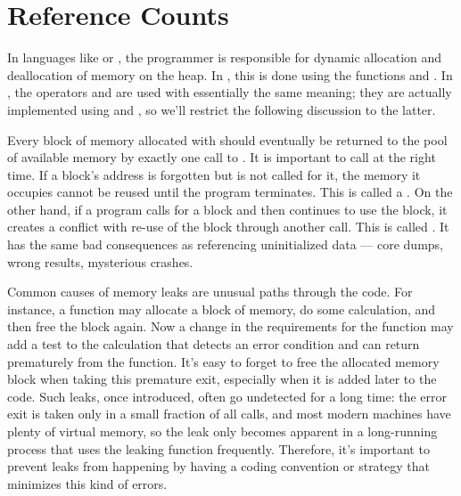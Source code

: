 \documentclass{manual}
\begin{document}
\section{Reference Counts}
\label{refcounts}


In languages like \C{} or \Cpp{}, the programmer is responsible for
dynamic allocation and deallocation of memory on the heap.  In \C{},
this is done using the functions  and
.  In \Cpp{}, the operators  and
 are used with essentially the same meaning; they are
actually implemented using  and
, so we'll restrict the following discussion to the
latter.

Every block of memory allocated with  should
eventually be returned to the pool of available memory by exactly one
call to .  It is important to call
 at the right time.  If a block's address is
forgotten but  is not called for it, the memory it
occupies cannot be reused until the program terminates.  This is
called a .  On the other hand, if a program calls
 for a block and then continues to use the block, it
creates a conflict with re-use of the block through another
 call.  This is called .
It has the same bad consequences as referencing uninitialized data ---
core dumps, wrong results, mysterious crashes.

Common causes of memory leaks are unusual paths through the code.  For
instance, a function may allocate a block of memory, do some
calculation, and then free the block again.  Now a change in the
requirements for the function may add a test to the calculation that
detects an error condition and can return prematurely from the
function.  It's easy to forget to free the allocated memory block when
taking this premature exit, especially when it is added later to the
code.  Such leaks, once introduced, often go undetected for a long
time: the error exit is taken only in a small fraction of all calls,
and most modern machines have plenty of virtual memory, so the leak
only becomes apparent in a long-running process that uses the leaking
function frequently.  Therefore, it's important to prevent leaks from
happening by having a coding convention or strategy that minimizes
this kind of errors.
\end{document}
